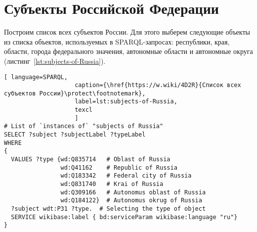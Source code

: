 \section{Субъекты Российской Федерации}

Построим список всех субъектов России. Для этого выберем следующие объекты из списка объектов, используемых в SPARQL-запросах: республики, края, области, города федерального значения, автономные области и автономные округа (листинг~\protect\ref{lst:subjects-of-Russia}).


\begin{lstlisting}[ language=SPARQL, 
                    caption={\href{https://w.wiki/4D2R}{Список всех субъектов России}\protect\footnotemark},
                    label=lst:subjects-of-Russia,
                    texcl 
                    ]
# List of `instances of` "subjects of Russia" 
SELECT ?subject ?subjectLabel ?typeLabel
WHERE
{  
  VALUES ?type {wd:Q835714   # Oblast of Russia
                wd:Q41162    # Republic of Russia
                wd:Q183342   # Federal city of Russia
                wd:Q831740   # Krai of Russia
                wd:Q309166   # Autonomus oblast of Russia
                wd:Q184122}  # Autonomus okrug of Russia
  ?subject wdt:P31 ?type.  # Selecting the type of object
  SERVICE wikibase:label { bd:serviceParam wikibase:language "ru"}
}
\end{lstlisting}%



